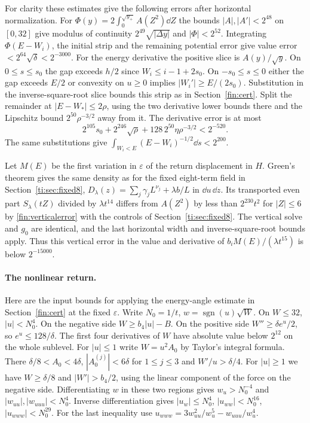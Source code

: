 For clarity these estimates give the following errors after horizontal
normalization. For $\Phi(y)=2\int_0^{\sqrt{y_+}} A(Z^2)\dd Z$ the
bounds $|A|,|A'|<2^{48}$ on $[0,32]$ give modulus of continuity
$2^{49}\sqrt{|\Delta y|}$ and $|\Phi|<2^{52}$. Integrating
$\Phi(E-W_i)$, the initial strip and the remaining potential error give
value error $<2^{64}\sqrt\delta<2^{-3000}$. For the energy derivative
the positive slice is $A(y)/\sqrt y$. On $0\le s\le s_0$ the gap exceeds
$h/2$ since $W_i\le i-1+2s_0$. On $-s_0\le s\le0$ either the gap
exceeds $E/2$ or convexity on $u\ge0$ implies $|W_i'|\ge E/(2s_0)$.
Substitution in the inverse-square-root slice bounds this strip as in
Section~\ref{fin:cert}. Split the remainder at $|E-W_*|\le2\rho$,
using the two derivative lower bounds there and the Lipschitz bound
$2^{50}\rho^{-3/2}$ away from it. The derivative error is at most
\[
 2^{105}s_0+2^{246}\sqrt{\rho}+128\,2^{50}\eta\rho^{-3/2}<2^{-520}.
\]
The same substitutions give $\int_{W_i<E}(E-W_i)^{-1/2}\dd s<2^{200}$.

Let $M(E)$ be the first variation in $\varepsilon$ of the return displacement
in $H$. Green's theorem gives the same density as for the fixed eight-term field in Section~\ref{ti:sec:fixed8},
$D_\lambda(z)=\sum_j\gamma_j L^{\nu_j}+\lambda b/L$ in $\dd u\,\dd z$. Its transported even part $S_\lambda(tZ)$
divided by $\lambda t^{14}$ differs from $A(Z^2)$ by less than
$2^{230}t^2$ for $|Z|\le6$ by \eqref{fin:verticalerror}
with the controls of Section~\ref{ti:sec:fixed8}.
The vertical solve and $g_0$ are identical, and the last horizontal
width and inverse-square-root bounds apply. Thus this vertical error
in the value and derivative of $b_i M(E)/(\lambda t^{15})$ is below
$2^{-15000}$.

\paragraph{The nonlinear return.}
Here are the input bounds for applying the energy-angle estimate
in Section~\ref{fin:cert} at the fixed $\varepsilon$.
Write $N_0=1/t$, $w=\operatorname{sgn}(u)\sqrt W$. On $W\le32$,
$|u|<N_0^4$. On the negative side $W\ge b_4|u|-B$. On the positive
side $W''\ge\delta e^u/2$, so $e^u\le128/\delta$. The first four
derivatives of $W$ have absolute value below $2^{12}$ on the whole
sublevel. For $|u|\le1$ write $W=u^2 A_0$ by Taylor's integral
formula. There $\delta/8<A_0<4\delta$, $|A_0^{(j)}|<6\delta$ for
$1\le j\le3$ and $W'/u>\delta/4$. For $|u|\ge1$ we have
$W\ge\delta/8$ and $|W'|>b_4/2$, using the linear component of the
force on the negative side. Differentiating $w$ in these two regions
gives $w_u>N_0^{-4}$ and $|w_{uu}|,|w_{uuu}|<N_0^4$. Inverse
differentiation gives $|u_w|\le N_0^4$, $|u_{ww}|<N_0^{16}$,
$|u_{www}|<N_0^{29}$. For the last inequality use
$u_{www}=3w_{uu}^2/w_u^5-w_{uuu}/w_u^4$.

